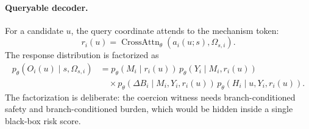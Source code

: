 \documentclass[10pt]{article}
\begin{document}
\paragraph{Queryable decoder.}
For a candidate \(u\), the query coordinate attends to the mechanism token:
\begin{equation}
    r_i(u)
    =
    \operatorname{CrossAttn}_\theta
    \left(
    a_i(u;s),\Omega_{s,i}
    \right).
    \label{eq:query_response_state}
\end{equation}
The response distribution is factorized as
\begin{equation}
\begin{aligned}
    p_\theta(O_i(u)\mid s,\Omega_{s,i})
    &=
    p_\theta(M_i\mid r_i(u))\,
    p_\theta(Y_i\mid M_i,r_i(u)) \\
    &\quad\times
    p_\theta(\Delta B_i\mid M_i,Y_i,r_i(u))\,
    p_\theta(H_i\mid u,Y_i,r_i(u)).
\end{aligned}
\label{eq:response_factorization}
\end{equation}
The factorization is deliberate: the coercion witness needs branch-conditioned safety and branch-conditioned burden, which would be hidden inside a single black-box risk score.
\end{document}
